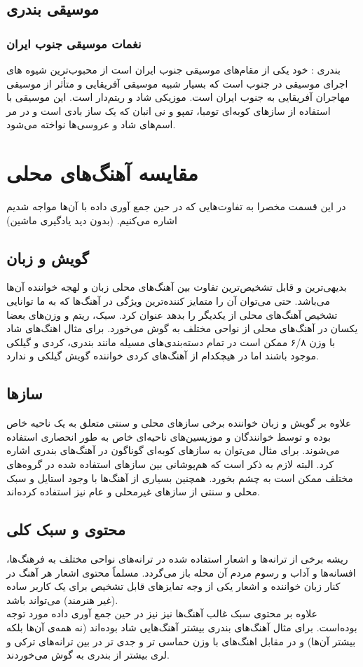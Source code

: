  \subsection{موسیقی بندری}
 \subsubsection{نغمات موسیقی جنوب ایران}
 بندری : خود یکی از مقام‌های موسیقی جنوب ایران است از محبوب‌ترین شیوه های اجرای موسیقی در جنوب است که بسیار شبیه موسیقی آفریقایی و متأثر از موسیقی مهاجران آفریقایی به جنوب ایران است. موزیکی شاد و ریتم‌دار است. این موسیقی با استفاده از ساز‌های کوبه‌ای تومبا، تمپو و نی انبان که یک ساز بادی است و در مر
 اسم‌های شاد و عروسی‌ها نواخته می‌شود.

 \section{مقایسه آهنگ‌های محلی}
در این قسمت مخصرا به تفاوت‌هایی که در حین جمع آوری داده با آن‌ها مواجه شدیم اشاره می‌کنیم. (بدون دید یادگیری ماشین)

\subsection{گویش و زبان}
بدیهی‌ترین و قابل تشخیص‌ترین تفاوت بین آهنگ‌های محلی زبان و لهجه خواننده آن‌ها می‌باشد. حتی می‌توان آن را متمایز کننده‌ترین ویژگی در آهنگ‌ها که به ما توانایی تشخیص آهنگ‌های محلی از یکدیگر را بدهد عنوان کرد. سبک، ریتم و وزن‌های بعضا یکسان در آهنگ‌های محلی از نواحی مختلف به گوش می‌خورد. برای مثال اهنگ‌های شاد با وزن ۶/۸ ممکن است در تمام دسته‌بندی‌های مسیله مانند بندری، کردی و گیلکی موجود باشند اما در هیچکدام از آهنگ‌های کردی خواننده گویش گیلکی و ندارد.
\subsection{سازها}
علاوه بر گویش و زبان خواننده برخی سازهای محلی و سنتی متعلق به یک ناحیه خاص بوده و توسط خوانندگان و موزیسین‌های ناحیه‌ای خاص به طور انحصاری استفاده می‌شوند. برای مثال می‌توان به سازهای کوبه‌ای گوناگون در آهنگ‌های بندری اشاره کرد. البته لازم به ذکر است که هم‌پوشانی بین سازهای استفاده شده در گروه‌های مختلف ممکن است به چشم بخورد. همچنین بسیاری از آهنگ‌ها با وجود استایل و سبک محلی و سنتی از سازهای غیرمحلی و عام نیز استفاده کرده‌اند.
\subsection{محتوی و سبک کلی}
ریشه برخی از ترانه‌ها و اشعار استفاده شده در ترانه‌های نواحی مختلف به فرهنگ‌ها، افسانه‌ها و آداب و رسوم مردم آن محله باز می‌گردد. مسلماً محتوی اشعار هر آهنگ در کنار زبان خواننده و اشعار یکی از وجه تمایزهای قابل تشخیص برای یک کاربر ساده (غیر هنرمند) می‌تواند باشد.\\
علاوه بر محتوی سبک غالب آهنگ‌ها نیز نیز در حین جمع آوری داده مورد توجه بوده‌است. برای مثال آهنگ‌های بندری بیشتر آهنگ‌هایی شاد بوده‌اند (نه همه‌ی آن‌ها بلکه بیشتر آن‌ها) و در مقابل اهنگ‌های با وزن حماسی تر و جدی تر در بین ترانه‌های ترکی و لری بیشتر از بندری به گوش می‌خوردند.
